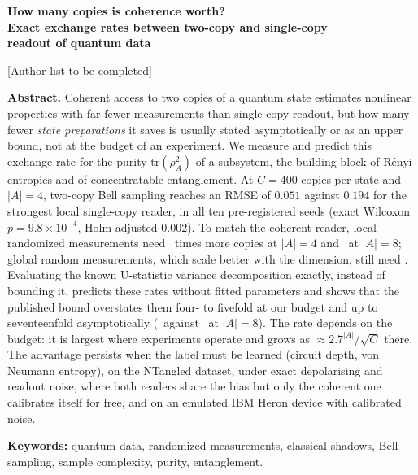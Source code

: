 \documentclass[11pt,a4paper]{article}
\begin{document}
\begin{center}
{\Large\bfseries How many copies is coherence worth?\\[0.3em]
Exact exchange rates between two-copy and single-copy\\
readout of quantum data}

\vspace{1.2em}

[Author list to be completed]

\end{center}

\vspace{0.5em}

\noindent\textbf{Abstract.}\quad
Coherent access to two copies of a quantum state estimates nonlinear properties with far fewer
measurements than single-copy readout, but how many fewer \emph{state preparations} it saves is
usually stated asymptotically or as an upper bound, not at the budget of an experiment. We measure and predict this exchange rate for the purity
$\mathrm{tr}(\rho_A^2)$ of a subsystem, the building block of R\'enyi entropies and of
concentratable entanglement. At $C=400$ copies per state and $|A|=4$, two-copy Bell sampling
reaches an RMSE of $0.051$ against $0.194$ for the strongest local single-copy reader, in all ten
pre-registered seeds (exact Wilcoxon $p=9.8\times10^{-4}$, Holm-adjusted $0.002$). To match the
coherent reader, local randomized measurements need \MultFour\ times more copies at $|A|=4$ and
\MultEight\ at $|A|=8$; global random measurements, which scale better with the dimension,
still need \GlobEight. Evaluating the known U-statistic variance
decomposition exactly, instead of bounding it, predicts these rates without fitted parameters and
shows that the published bound overstates them four- to fivefold at our budget and up to
seventeenfold asymptotically (\BoundInfEight\ against \ExactInfEight\ at $|A|=8$). The rate depends on the budget: it is largest where experiments
operate and grows as $\approx2.7^{|A|}/\sqrt{C}$ there. The advantage persists when the label must
be learned (circuit depth, von Neumann entropy), on the NTangled dataset, under exact depolarising
and readout noise, where both readers share the bias but only the coherent one calibrates itself for
free, and on an emulated IBM Heron device with calibrated noise.

\vspace{0.4em}
\noindent\textbf{Keywords:} quantum data, randomized measurements, classical shadows, Bell sampling,
sample complexity, purity, entanglement.
\end{document}
